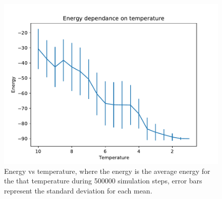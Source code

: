 \documentclass{article}
\begin{document}
\begin{figure}[H]
    \centerline{\includegraphics[scale=0.6]{images/Q3d_iii.pdf}}
    \caption{Energy vs temperature, where the energy is the average energy for the that temperature during 500000 simulation steps, error bars represent the standard deviation for each mean.}
    \label{fig:3d}
\end{figure}
\end{document}
